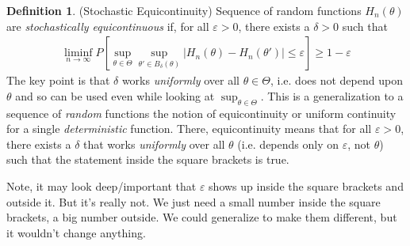 \documentclass[12pt]{article}
\theoremstyle{plain}
\theoremstyle{definition}
\newtheorem{defn}[thm]{Definition}
\theoremstyle{remark}
\newcommand{\ra}{\rightarrow}
\begin{document}
\begin{defn}(Stochastic Equicontinuity)
Sequence of random functions $H_n(\theta)$ are
\emph{stochastically equicontinuous} if, for all $\varepsilon>0$, there
exists a $\delta>0$ such that
\begin{align*}
  \liminf_{n\ra\infty}
  P
  \left[
    \sup_{\theta\in\Theta}
    \sup_{\theta'\in B_\delta(\theta)}
    |H_n(\theta)-H_n(\theta')|
    \leq
    \varepsilon
  \right]
  \geq 1-\varepsilon
\end{align*}
The key point is that $\delta$ works \emph{uniformly} over all
$\theta\in\Theta$, i.e. does not depend upon $\theta$ and so can be used
even while looking at $\sup_{\theta\in\Theta}$.
This is a generalization to a sequence of \emph{random} functions the
notion of equicontinuity or uniform continuity for a single
\emph{deterministic} function.
There, equicontinuity means that for all $\varepsilon>0$, there exists a
$\delta$ that works \emph{uniformly} over all $\theta$ (i.e. depends
only on $\varepsilon$, not $\theta$) such that the statement inside the
square brackets is true.

Note, it may look deep/important that $\varepsilon$ shows up inside the
square brackets and outside it. But it's really not.
We just need a small number inside the square brackets, a big number
outside. We could generalize to make them different, but it wouldn't
change anything.
\end{defn}
\end{document}
